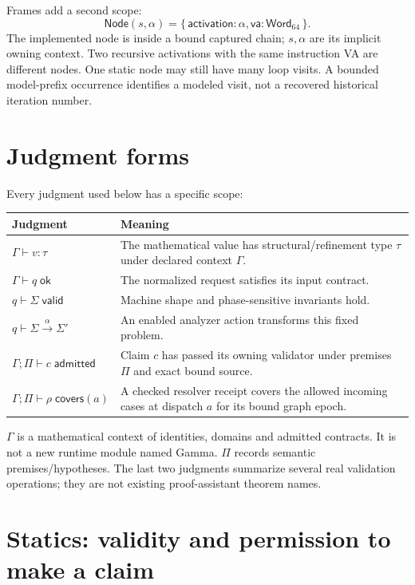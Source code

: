 \documentclass[11pt,a4paper]{article}
\newcommand{\ty}[1]{\mathsf{#1}}
\newcommand{\rec}[1]{\{\,#1\,\}}
\newcommand{\code}[1]{\texttt{\detokenize{#1}}}
\begin{document}
Frames add a second scope:
\[
 \ty{Node}(s,\alpha)=\rec{\ty{activation}:\alpha,\ty{va}:\ty{Word}_{64}}.
\]
The implemented node is \code{(frame, site)} inside a bound captured chain;
$s,\alpha$ are its implicit owning context. Two recursive activations with
the same instruction VA are different nodes. One static node may still have
many loop visits. A bounded model-prefix occurrence identifies a modeled
visit, not a recovered historical iteration number.

\section{Judgment forms}
\label{sec:judgments}
Every judgment used below has a specific scope:
\begin{longtable}{@{}p{.39\linewidth}p{.55\linewidth}@{}}
\toprule Judgment & Meaning\\\midrule\endhead
$\Gamma\vdash v:\tau$ & The mathematical value has structural/refinement type $\tau$ under declared context $\Gamma$.\\
$\Gamma\vdash q\;\ty{ok}$ & The normalized request satisfies its input contract.\\
$q\vdash\Sigma\;\ty{valid}$ & Machine shape and phase-sensitive invariants hold.\\
$q\vdash\Sigma\xrightarrow{\alpha}\Sigma'$ & An enabled analyzer action transforms this fixed problem.\\
$\Gamma;\Pi\vdash c\;\ty{admitted}$ & Claim $c$ has passed its owning validator under premises $\Pi$ and exact bound source.\\
$\Gamma;\Pi\vdash\rho\;\ty{covers}(a)$ & A checked resolver receipt covers the allowed incoming cases at dispatch $a$ for its bound graph epoch.\\
\bottomrule
\end{longtable}
$\Gamma$ is a mathematical context of identities, domains and admitted
contracts. It is not a new runtime module named Gamma. $\Pi$ records semantic
premises/hypotheses. The last two judgments summarize several real validation
operations; they are not existing proof-assistant theorem names.

\section{Statics: validity and permission to make a claim}
\label{sec:statics}
\end{document}
